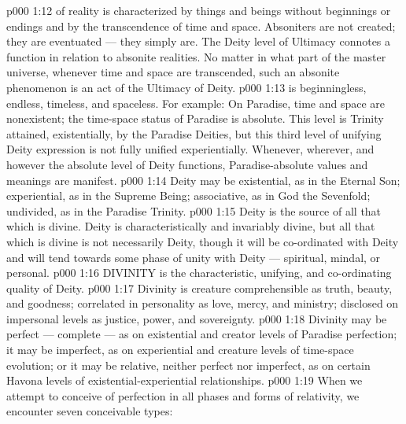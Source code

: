 \vs p000 1:12 \pc {} of reality is characterized by things and beings without beginnings or endings and by the transcendence of time and space. Absoniters are not created; they are eventuated --- they simply are. The Deity level of Ultimacy connotes a function in relation to absonite realities. No matter in what part of the master universe, whenever time and space are transcended, such an absonite phenomenon is an act of the Ultimacy of Deity.
\vs p000 1:13 \pc {} is beginningless, endless, timeless, and spaceless. For example: On Paradise, time and space are nonexistent; the time\hyp{}space status of Paradise is absolute. This level is Trinity attained, existentially, by the Paradise Deities, but this third level of unifying Deity expression is not fully unified experientially. Whenever, wherever, and however the absolute level of Deity functions, Paradise\hyp{}absolute values and meanings are manifest.
\vs p000 1:14 \pc Deity may be existential, as in the Eternal Son; experiential, as in the Supreme Being; associative, as in God the Sevenfold; undivided, as in the Paradise Trinity.
\vs p000 1:15 Deity is the source of all that which is divine. Deity is characteristically and invariably divine, but all that which is divine is not necessarily Deity, though it will be co\hyp{}ordinated with Deity and will tend towards some phase of unity with Deity --- spiritual, mindal, or personal.
\vs p000 1:16 \pc DIVINITY is the characteristic, unifying, and co\hyp{}ordinating quality of Deity.
\vs p000 1:17 Divinity is creature comprehensible as truth, beauty, and goodness; correlated in personality as love, mercy, and ministry; disclosed on impersonal levels as justice, power, and sovereignty.
\vs p000 1:18 Divinity may be perfect --- complete --- as on existential and creator levels of Paradise perfection; it may be imperfect, as on experiential and creature levels of time\hyp{}space evolution; or it may be relative, neither perfect nor imperfect, as on certain Havona levels of existential\hyp{}experiential relationships.
\vs p000 1:19 \pc When we attempt to conceive of perfection in all phases and forms of relativity, we encounter seven conceivable types:

